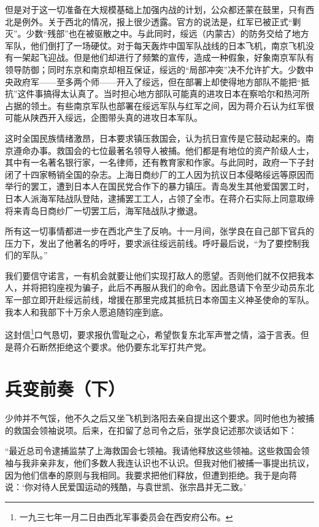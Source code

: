\documentclass[10pt]{book}
\begin{document}
但是对于这一切准备在大规模基础上加强内战的计划，公众都还蒙在鼓里，只有西北是例外。关于西北的情况，报上很少透露。官方的说法是，红军已被正式“剿灭”。少数“残部”也在被驱散之中。与此同时，绥远（内蒙古）的防务交给了地方军队，他们倒打了一场硬仗。对于每天轰炸中国军队战线的日本飞机，南京飞机没有一架起飞迎战。但是他们却进行了频繁的宣传，造成一种假象，好象南京军队有领导防御；同时东京和南京却相互保证，绥远的“局部冲突”决不允许扩大。少数中央政府军——至多两个师——开入了绥远，但在部署上却使得地方部队不能把“抵抗”这件事搞得太认真了。当时担心地方部队可能真的进攻日本在察哈尔和热河所占据的领土。有些南京军队也部署在绥远军队与红军之间，因为蒋介石认为红军很可能从陕西开入绥远，企图带头真的进攻日本军队。

这时全国民族情绪激昂，日本要求镇压救国会，认为抗日宣传是它鼓动起来的。南京遵命办事。救国会的七位最著名领导人被捕。他们都是有地位的资产阶级人士，其中有一名著名银行家，一名律师，还有教育家和作家。与此同时，政府一下子封闭了十四家畅销全国的杂志。上海日商纱厂的工人因为抗议日本侵略绥远等原因而举行的罢工，遭到日本人在国民党合作下的暴力镇压。青岛发生其他爱国罢工时，日本人派海军陆战队登陆，逮捕罢工工人，占领了全市。在蒋介石实际上同意取缔将来青岛日商纱厂一切罢工后，海军陆战队才撤退。

所有这一切事情都进一步在西北产生了反响。十一月间，张学良在自己部下官兵的压力下，发出了他著名的呼吁，要求派往绥远前线。呼吁最后说，“为了要控制我们的军队。”

我们要信守诺言，一有机会就要让他们实现打敌人的愿望。否则他们就不仅把我本人，并将把钧座视为骗子，此后不再服从我们的命令。因此恳请下令至少动员东北军一部立即开赴绥远前线，增援在那里完成其抵抗日本帝国主义神圣使命的军队。我本人和我部下十万余人愿追随钧座到底。

这封信\footnote{一九三七年一月二日由西北军事委员会在西安府公布。}口气恳切，要求报仇雪耻之心，希望恢复东北军声誉之情，溢于言表。但是蒋介石断然拒绝这个要求。他仍要东北军打共产党。



\section{兵变前奏（下）}

少帅并不气馁，他不久之后又坐飞机到洛阳去亲自提出这个要求。同时他也为被捕的救国会领袖说项。后来，在扣留了总司令之后，张学良记述那次谈话如下：

“最近总司令逮捕监禁了上海救国会七领袖。我请他释放这些领袖。这些救国会领袖与我非亲非友，他们多数人我连认识也不认识。但我对他们被捕一事提出抗议，因为他们信奉的原则与我相同。我要求把他们释放，但遭到拒绝。我于是向蒋说：‘你对待人民爱国运动的残酷，与袁世凯、张宗昌并无二致。’
\end{document}

